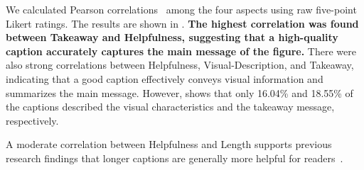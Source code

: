 



We calculated Pearson correlations~\cite{doi:10.1080/00031305.1988.10475524} among the four aspects using raw five-point Likert ratings.
The results are shown in . 
\textbf{The highest correlation was found between Takeaway and Helpfulness, suggesting that a high-quality caption accurately captures the main message of the figure.}
There were also strong correlations between Helpfulness, Visual-Description, and Takeaway, indicating that a good caption effectively conveys visual information and summarizes the main message.
However,
 shows that
only 16.04\% and 18.55\% of the captions described the visual characteristics and the takeaway message, respectively. 

A moderate correlation between Helpfulness and Length supports previous research findings that longer captions are generally more helpful for readers~\cite{hartley2003single,gelman2002let}.




